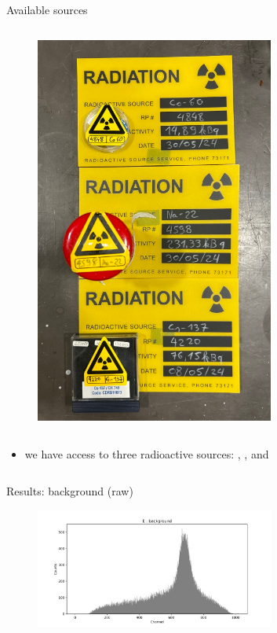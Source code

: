 \begin{columnframe}{Available sources}
    \begin{column}{0.5\textwidth}
        \begin{figure}
            \centering
            \includegraphics[width=0.7\textwidth]{images/radioactive_sources.png}
        \end{figure}
    \end{column}
    \begin{column}{0.5\textwidth}
        \begin{itemize}
            \item we have access to three radioactive sources: , , and 
        \end{itemize}
    \end{column}
\end{columnframe}

\begin{frame}{Results: background (raw)}
    \begin{figure}
        \centering
        \includegraphics[width=0.7\textwidth]{images/background.png}
    \end{figure}
\end{frame}

